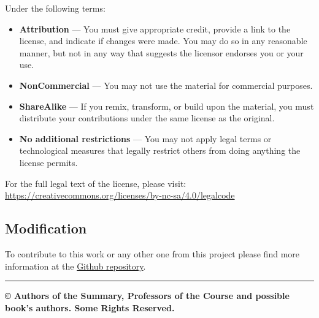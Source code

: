 \documentclass[
  a4paper,
  ,captions=tableheading
]{scrartcl}
\providecommand{\tightlist}{%
  \setlength{\itemsep}{0pt}\setlength{\parskip}{0pt}}
\begin{document}
Under the following terms:

\begin{itemize}
\tightlist
\item
  \textbf{Attribution} --- You must give appropriate credit, provide a
  link to the license, and indicate if changes were made. You may do so
  in any reasonable manner, but not in any way that suggests the
  licensor endorses you or your use.
\item
  \textbf{NonCommercial} --- You may not use the material for commercial
  purposes.
\item
  \textbf{ShareAlike} --- If you remix, transform, or build upon the
  material, you must distribute your contributions under the same
  license as the original.
\item
  \textbf{No additional restrictions} --- You may not apply legal terms
  or technological measures that legally restrict others from doing
  anything the license permits.
\end{itemize}

For the full legal text of the license, please visit:
\url{https://creativecommons.org/licenses/by-nc-sa/4.0/legalcode}

\subsection{Modification}\label{modification}

To contribute to this work or any other one from this project please
find more information at the
\href{https://github.com/Tfloow/ESATSummary}{Github repository}.

\begin{center}\rule{0.5\linewidth}{0.5pt}\end{center}

\textbf{© \the\year{} Authors of the Summary, Professors of the Course and
possible book's authors. Some Rights Reserved.}
\end{document}
